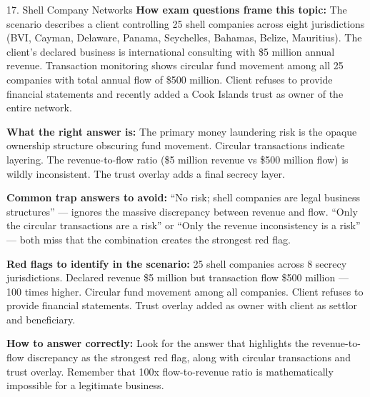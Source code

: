 \documentclass[11pt,a4paper]{beamer}
\begin{document}
	\begin{frame}{17. Shell Company Networks}
		\tiny
		\noindent\textbf{How exam questions frame this topic:} The scenario describes a client controlling 25 shell companies across eight jurisdictions (BVI, Cayman, Delaware, Panama, Seychelles, Bahamas, Belize, Mauritius). The client's declared business is international consulting with \$5 million annual revenue. Transaction monitoring shows circular fund movement among all 25 companies with total annual flow of \$500 million. Client refuses to provide financial statements and recently added a Cook Islands trust as owner of the entire network.
		
		\vspace{0.1cm}
		\noindent\textbf{What the right answer is:} The primary money laundering risk is the opaque ownership structure obscuring fund movement. Circular transactions indicate layering. The revenue-to-flow ratio (\$5 million revenue vs \$500 million flow) is wildly inconsistent. The trust overlay adds a final secrecy layer.
		
		\vspace{0.1cm}
		\noindent\textbf{Common trap answers to avoid:} “No risk; shell companies are legal business structures” — ignores the massive discrepancy between revenue and flow. “Only the circular transactions are a risk” or “Only the revenue inconsistency is a risk” — both miss that the combination creates the strongest red flag.
		
		\vspace{0.1cm}
		\noindent\textbf{Red flags to identify in the scenario:} 25 shell companies across 8 secrecy jurisdictions. Declared revenue \$5 million but transaction flow \$500 million — 100 times higher. Circular fund movement among all companies. Client refuses to provide financial statements. Trust overlay added as owner with client as settlor and beneficiary.
		
		\vspace{0.1cm}
		\noindent\textbf{How to answer correctly:} Look for the answer that highlights the revenue-to-flow discrepancy as the strongest red flag, along with circular transactions and trust overlay. Remember that 100x flow-to-revenue ratio is mathematically impossible for a legitimate business.
	\end{frame}
	
\end{document}

